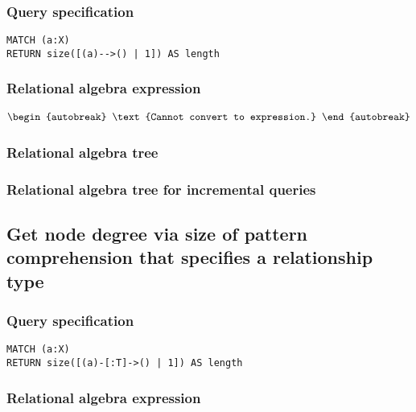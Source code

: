 \subsubsection*{Query specification}

\begin{lstlisting}
MATCH (a:X)
RETURN size([(a)-->() | 1]) AS length
\end{lstlisting}

\subsubsection*{Relational algebra expression}

\begin{align*}
\begin{autobreak}
\text{Cannot convert to expression.}
\end{autobreak}
\end{align*}

\subsubsection*{Relational algebra tree}


\subsubsection*{Relational algebra tree for incremental queries}


\subsection{Get node degree via size of pattern comprehension that specifies a relationship type}

\subsubsection*{Query specification}

\begin{lstlisting}
MATCH (a:X)
RETURN size([(a)-[:T]->() | 1]) AS length
\end{lstlisting}

\subsubsection*{Relational algebra expression}

